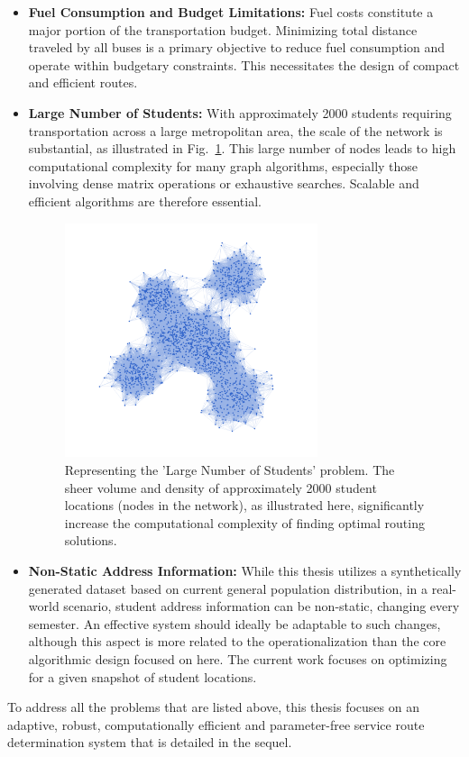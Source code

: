 \begin{itemize}
    \item \textbf{Fuel Consumption and Budget Limitations:} Fuel costs constitute a major portion of the transportation budget. Minimizing total distance traveled by all buses is a primary objective to reduce fuel consumption and operate within budgetary constraints. This necessitates the design of compact and efficient routes.

    \item \textbf{Large Number of Students:} With approximately 2000 students requiring transportation across a large metropolitan area, the scale of the network is substantial, as illustrated in Fig.~\ref{fig:problem_large_scale}. This large number of nodes leads to high computational complexity for many graph algorithms, especially those involving dense matrix operations or exhaustive searches. Scalable and efficient algorithms are therefore essential.
    \begin{figure}[!htbp]
        \centering
        \includegraphics[width=0.7\textwidth]{img/large_scale_students.png}
        \caption{Representing the 'Large Number of Students' problem. The sheer volume and density of approximately 2000 student locations (nodes in the network), as illustrated here, significantly increase the computational complexity of finding optimal routing solutions.}
        \label{fig:problem_large_scale}
    \end{figure}

    \item \textbf{Non-Static Address Information:} While this thesis utilizes a synthetically generated dataset based on current general population distribution, in a real-world scenario, student address information can be non-static, changing every semester. An effective system should ideally be adaptable to such changes, although this aspect is more related to the operationalization than the core algorithmic design focused on here. The current work focuses on optimizing for a given snapshot of student locations.
\end{itemize}
To address all the problems that are listed above, this thesis focuses on an adaptive, robust, computationally efficient and parameter-free service route determination system that is detailed in the sequel.

